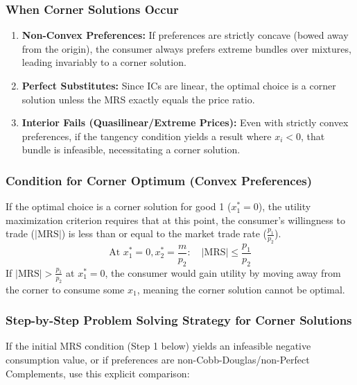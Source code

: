 \documentclass{article}
\begin{document}
\subsubsection*{When Corner Solutions Occur}

\begin{enumerate}
    \item \textbf{Non-Convex Preferences:} If preferences are strictly concave (bowed away from the origin), the consumer always prefers extreme bundles over mixtures, leading invariably to a corner solution.
    \item \textbf{Perfect Substitutes:} Since ICs are linear, the optimal choice is a corner solution unless the MRS exactly equals the price ratio.
    \item \textbf{Interior Fails (Quasilinear/Extreme Prices):} Even with strictly convex preferences, if the tangency condition yields a result where $x_i < 0$, that bundle is infeasible, necessitating a corner solution.
\end{enumerate}

\subsubsection*{Condition for Corner Optimum (Convex Preferences)}

If the optimal choice is a corner solution for good 1 ($x_1^*=0$), the utility maximization criterion requires that at this point, the consumer's willingness to trade ($|\text{MRS}|$) is less than or equal to the market trade rate ($\frac{p_1}{p_2}$).
\[ \text{At } x_1^* =0, x_2^*=\frac{m}{p_2}: \quad |\text{MRS}| \leq \frac{p_1}{p_2} \]
If $|\text{MRS}| > \frac{p_1}{p_2}$ at $x_1^*=0$, the consumer would gain utility by moving away from the corner to consume some $x_1$, meaning the corner solution cannot be optimal.

\subsubsection*{Step-by-Step Problem Solving Strategy for Corner Solutions}

If the initial MRS condition (Step 1 below) yields an infeasible negative consumption value, or if preferences are non-Cobb-Douglas/non-Perfect Complements, use this explicit comparison:
\end{document}
